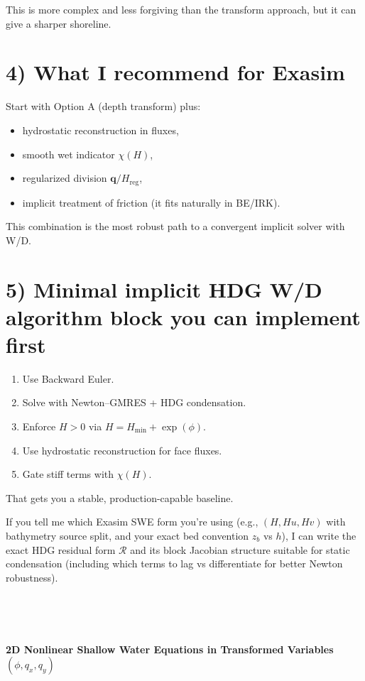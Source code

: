 \documentclass[11pt]{article}
\begin{document}
This is more complex and less forgiving than the transform approach, but it can give a sharper shoreline.

\section*{4) What I recommend for Exasim}

Start with Option A (depth transform) plus:
\begin{itemize}
\item hydrostatic reconstruction in fluxes,
\item smooth wet indicator $\chi(H)$,
\item regularized division $\mathbf{q}/H_{\text{reg}}$,
\item implicit treatment of friction (it fits naturally in BE/IRK).
\end{itemize}

This combination is the most robust path to a convergent implicit solver with W/D.

\section*{5) Minimal implicit HDG W/D algorithm block you can implement first}

\begin{enumerate}
\item Use Backward Euler.
\item Solve with Newton–GMRES + HDG condensation.
\item Enforce $H>0$ via $H=H_{\min}+\exp(\phi)$.
\item Use hydrostatic reconstruction for face fluxes.
\item Gate stiff terms with $\chi(H)$.
\end{enumerate}

That gets you a stable, production-capable baseline.

If you tell me which Exasim SWE form you’re using (e.g., $(H,Hu,Hv)$ with bathymetry source split, and your exact bed convention $z_b$ vs $h$), I can write the exact HDG residual form $\mathcal{R}$ and its block Jacobian structure suitable for static condensation (including which terms to lag vs differentiate for better Newton robustness).


\

\

\noindent 
{\Large \textbf{2D Nonlinear Shallow Water Equations in Transformed Variables $(\phi,q_x,q_y)$}}
\end{document}
